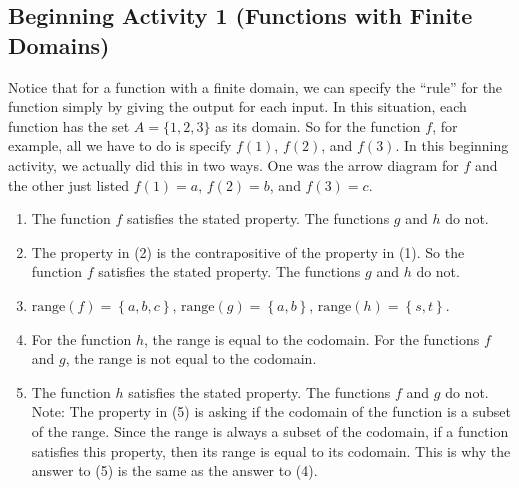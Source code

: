 \documentclass[11pt]{article}
\begin{document}
\subsection*{Beginning Activity 1 (Functions with Finite Domains)}
Notice that for a function with a finite domain, we can specify the ``rule'' for the function simply by giving the output for each input.  In this situation, each function has the set $A = \{1, 2, 3 \}$ as its domain.  So for the function $f$, for example, all we have to do is specify $f(1)$, $f(2)$, and $f(3)$.  In this beginning activity, we actually did this in two ways.  One was the arrow diagram for $f$ and the other just listed $f(1) = a$, $f(2) = b$, and $f(3) = c$.
\begin{enumerate}
\item The function  $f$  satisfies the stated property.  The functions  $g$  and  $h$  do not.

\item The property in (2) is the contrapositive of the property in (1).  So the function  $f$  satisfies the stated property.  The functions  $g$  and  $h$  do not.

\item $\text{range}\left( f \right) = \left\{ {a, b, c} \right\}$, 
	$\text{range}\left( g \right) = \left\{ {a, b} \right\}$, 
	$\text{range}\left( h \right) = \left\{ {s, t} \right\}$.

\item For the function  $h$, the range is equal to the codomain.  For the functions  $f$  and  
$g$, the range is not equal to the codomain.





\item The function  $h$  satisfies the stated property.  The functions  $f$  and  $g$  do not.
Note:  The property in (5) is asking if the codomain of the function is a subset of the range.  Since the range is always a subset of the codomain, if a function satisfies this property, then its range is equal to its codomain.  This is why the answer to (5) is the same as the answer to (4).
\end{enumerate}
\hbreak

\newpage
\noindent
\end{document}
